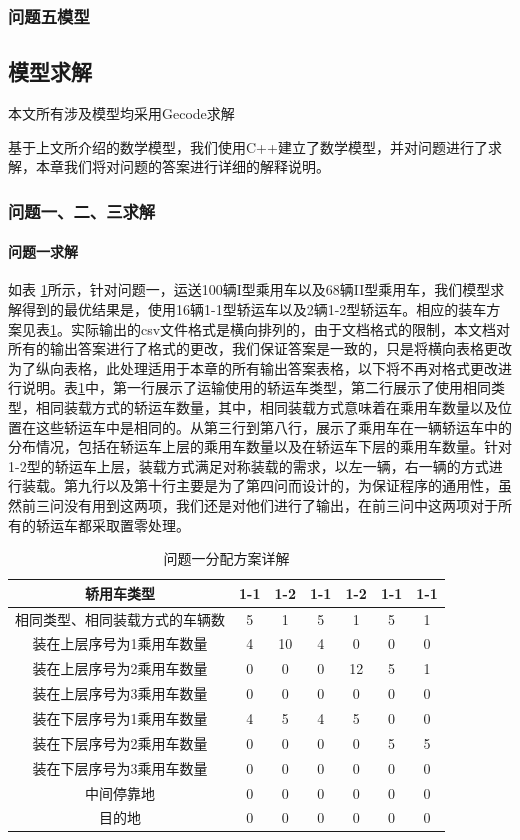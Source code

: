 \documentclass[UTF8]{ctexart}
\begin{document}
\subsubsection{问题五模型}

\subsection{模型求解}
本文所有涉及模型均采用Gecode\cite{gecode}求解

基于上文所介绍的数学模型，我们使用C++建立了数学模型，并对问题进行了求解，本章我们将对问题的答案进行详细的解释说明。

\subsubsection{问题一、二、三求解}
\paragraph{问题一求解}

如表 \ref{tab:answer1}所示，针对问题一，运送100辆I型乘用车以及68辆II型乘用车，我们模型求解得到的最优结果是，使用16辆1-1型轿运车以及2辆1-2型轿运车。相应的装车方案见表\ref{tab:answer1}。实际输出的csv文件格式是横向排列的，由于文档格式的限制，本文档对所有的输出答案进行了格式的更改，我们保证答案是一致的，只是将横向表格更改为了纵向表格，此处理适用于本章的所有输出答案表格，以下将不再对格式更改进行说明。表\ref{tab:answer1}中，第一行展示了运输使用的轿运车类型，第二行展示了使用相同类型，相同装载方式的轿运车数量，其中，相同装载方式意味着在乘用车数量以及位置在这些轿运车中是相同的。从第三行到第八行，展示了乘用车在一辆轿运车中的分布情况，包括在轿运车上层的乘用车数量以及在轿运车下层的乘用车数量。针对1-2型的轿运车上层，装载方式满足对称装载的需求，以左一辆，右一辆的方式进行装载。第九行以及第十行主要是为了第四问而设计的，为保证程序的通用性，虽然前三问没有用到这两项，我们还是对他们进行了输出，在前三问中这两项对于所有的轿运车都采取置零处理。

\begin{table}[h!]
\centering
\caption{问题一分配方案详解}\label{tab:answer1}
\begin{tabular}{|c|c|c|c|c|c|c|}
\hline
轿用车类型 & 1-1 & 1-2 & 1-1 & 1-2 & 1-1 & 1-1\\ \hline 
相同类型、相同装载方式的车辆数 & 5 & 1 & 5 & 1 & 5 & 1\\ \hline 
装在上层序号为1乘用车数量 & 4 & 10 & 4 & 0 & 0 & 0\\ \hline 
装在上层序号为2乘用车数量 & 0 & 0 & 0 & 12 & 5 & 1\\ \hline 
装在上层序号为3乘用车数量 & 0 & 0 & 0 & 0 & 0 & 0\\ \hline 
装在下层序号为1乘用车数量 & 4 & 5 & 4 & 5 & 0 & 0\\ \hline 
装在下层序号为2乘用车数量 & 0 & 0 & 0 & 0 & 5 & 5\\ \hline 
装在下层序号为3乘用车数量 & 0 & 0 & 0 & 0 & 0 & 0\\ \hline 
中间停靠地 & 0 & 0 & 0 & 0 & 0 & 0\\ \hline 
目的地 & 0 & 0 & 0 & 0 & 0 & 0\\ \hline
\end{tabular}
\end{table}
\end{document}
